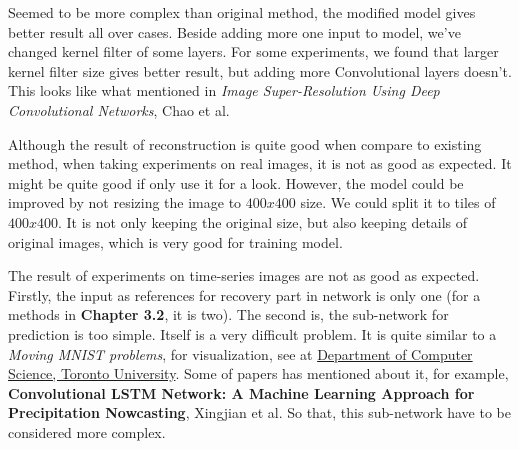 Seemed to be more complex than original method, the modified model gives better result all over cases. Beside adding more one input to model, we've changed kernel filter of some layers. For some experiments, we found that larger kernel filter size gives better result, but adding more Convolutional layers doesn't. This looks like what mentioned in \textit{Image Super-Resolution Using Deep Convolutional Networks}, Chao et al.

Although the result of reconstruction is quite good when compare to existing method, when taking experiments on real images, it is not as good as expected. It might be quite good if only use it for a look. However, the model could be improved by not resizing the image to $400x400$ size. We could split it to tiles of $400x400$. It is not only keeping the original size, but also keeping details of original images, which is very good for training model.

The result of experiments on time-series images are not as good as expected. Firstly, the input as references for recovery part in network is only one (for a methods in \textbf{Chapter 3.2}, it is two). The second is, the sub-network for prediction is too simple. Itself is a very difficult problem. It is quite similar to a \textit{Moving MNIST problems}, for visualization, see at \href{http://www.cs.toronto.edu/~nitish/unsupervised_video/}{Department of Computer Science, Toronto University}. Some of papers has mentioned about it, for example, \textbf{Convolutional LSTM Network: A Machine Learning Approach for Precipitation Nowcasting}, Xingjian et al. So that, this sub-network have to be considered more complex. 